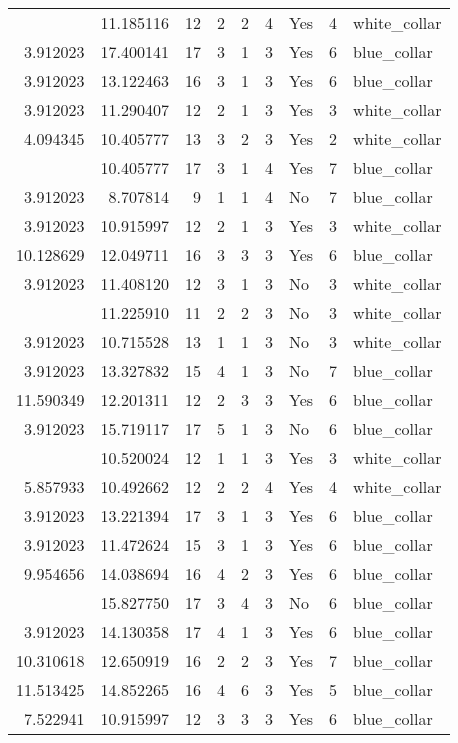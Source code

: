 \documentclass[
]{article}
\begin{document}
\begin{longtable}[t]{rrrrrllrl}
\addlinespace
8.621553 & 11.185116 & 12 & 2 & 2 & 4 & Yes & 4 & white\_collar\\
3.912023 & 17.400141 & 17 & 3 & 1 & 3 & Yes & 6 & blue\_collar\\
3.912023 & 13.122463 & 16 & 3 & 1 & 3 & Yes & 6 & blue\_collar\\
3.912023 & 11.290407 & 12 & 2 & 1 & 3 & Yes & 3 & white\_collar\\
4.094345 & 10.405777 & 13 & 3 & 2 & 3 & Yes & 2 & white\_collar\\
\addlinespace
3.912023 & 10.405777 & 17 & 3 & 1 & 4 & Yes & 7 & blue\_collar\\
3.912023 & 8.707814 & 9 & 1 & 1 & 4 & No & 7 & blue\_collar\\
3.912023 & 10.915997 & 12 & 2 & 1 & 3 & Yes & 3 & white\_collar\\
10.128629 & 12.049711 & 16 & 3 & 3 & 3 & Yes & 6 & blue\_collar\\
3.912023 & 11.408120 & 12 & 3 & 1 & 3 & No & 3 & white\_collar\\
\addlinespace
6.956545 & 11.225910 & 11 & 2 & 2 & 3 & No & 3 & white\_collar\\
3.912023 & 10.715528 & 13 & 1 & 1 & 3 & No & 3 & white\_collar\\
3.912023 & 13.327832 & 15 & 4 & 1 & 3 & No & 7 & blue\_collar\\
11.590349 & 12.201311 & 12 & 2 & 3 & 3 & Yes & 6 & blue\_collar\\
3.912023 & 15.719117 & 17 & 5 & 1 & 3 & No & 6 & blue\_collar\\
\addlinespace
3.912023 & 10.520024 & 12 & 1 & 1 & 3 & Yes & 3 & white\_collar\\
5.857933 & 10.492662 & 12 & 2 & 2 & 4 & Yes & 4 & white\_collar\\
3.912023 & 13.221394 & 17 & 3 & 1 & 3 & Yes & 6 & blue\_collar\\
3.912023 & 11.472624 & 15 & 3 & 1 & 3 & Yes & 6 & blue\_collar\\
9.954656 & 14.038694 & 16 & 4 & 2 & 3 & Yes & 6 & blue\_collar\\
\addlinespace
13.138335 & 15.827750 & 17 & 3 & 4 & 3 & No & 6 & blue\_collar\\
3.912023 & 14.130358 & 17 & 4 & 1 & 3 & Yes & 6 & blue\_collar\\
10.310618 & 12.650919 & 16 & 2 & 2 & 3 & Yes & 7 & blue\_collar\\
11.513425 & 14.852265 & 16 & 4 & 6 & 3 & Yes & 5 & blue\_collar\\
7.522941 & 10.915997 & 12 & 3 & 3 & 3 & Yes & 6 & blue\_collar\\

\end{longtable}
\end{document}
